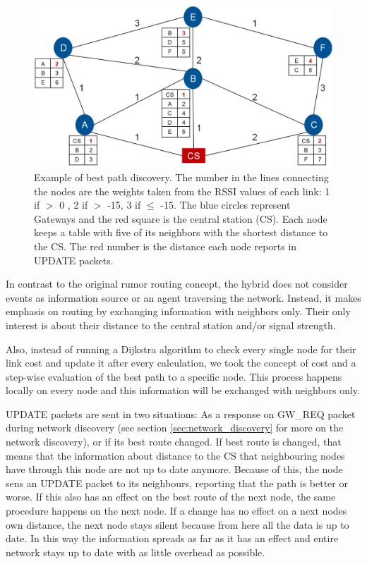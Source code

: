 \begin{figure}
    \centering
    \includegraphics[width=15cm]{images/Example_Routing.png}
	\vspace{-1.5em}
    \caption[Best path discovery example]{Example of best path discovery. 
	The number in the lines connecting the nodes are the weights taken from the RSSI values of each link: 1 if \(>\) 0 , 2 if \(>\) -15, 3 if \(\leq\) -15.
	The blue circles represent Gateways and the red square is the central station (CS).
	Each node keeps a table with five of its neighbors with the shortest distance to the CS.
	The red number is the distance each node reports in UPDATE packets.}
    \vspace{-1.5em}
    \label{fig:routing}
\end{figure}

In contrast to the original rumor routing concept, the hybrid does not consider events as information source or an agent traversing the network. 
Instead, it makes emphasis on routing by exchanging information with neighbors only. 
Their only interest is about their distance to the central station and/or signal strength.

Also, instead of running a Dijkstra algorithm to check every single node for their link cost and update it after every calculation, we took the concept of cost and a step-wise evaluation of the best path to a specific node. 
This process happens locally on every node and this information will be exchanged with neighbors only. 

UPDATE packets are sent in two situations: As a response on GW\_REQ packet during network discovery (see section \ref{sec:network_discovery} for more on the network discovery), or if its best route changed.
If best route is changed, that means that the information about distance to the CS that neighbouring nodes have through this node are not up to date anymore. Because of this, the node sens an UPDATE packet to its neighbours, reporting that the path is better or worse. If this also has an effect on the best route of the next node, the same procedure happens on the next node. If a change has no effect on a next nodes own distance, the next node stays silent because from here all the data is up to date. In this way the information spreads as far as it has an effect and entire network stays up to date with as little overhead as possible.